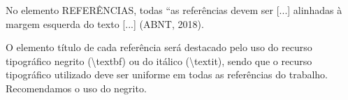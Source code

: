 \documentclass[
  oneside, %
  english,
  brazil
]{abntbibufjf}
\begin{document}
\postextual{}



No elemento REFERÊNCIAS, todas ``as referências devem ser [...] alinhadas à margem esquerda do texto [...] (ABNT, 2018).

O elemento título de cada referência será destacado pelo uso do recurso tipográfico negrito (\textbackslash{}textbf) ou do itálico (\textbackslash{}textit), sendo que o recurso tipográfico utilizado deve ser uniforme em todas as referências do trabalho.
Recomendamos o uso do negrito.

\begin{thebibliography}{99}









\end{thebibliography}
\end{document}
